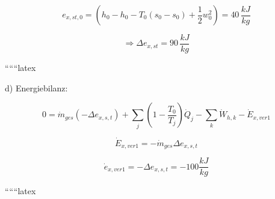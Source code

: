 \[
e_{x,st,0} = \left( h_0 - h_0 - T_0 (s_0 - s_0) + \frac{1}{2} w_0^2 \right) = 40 \, \frac{kJ}{kg}
\]

\[
\Rightarrow \Delta e_{x,st} = 90 \, \frac{kJ}{kg}
\]

``````latex

d) Energiebilanz:

\[
0 = \dot{m}_{ges} \left( -\Delta e_{x,s,t} \right) + \sum_j \left( 1 - \frac{T_0}{T_j} \right) \dot{Q}_j - \sum_k \dot{W}_{h,k} - \dot{E}_{x,ver1}
\]

\[
\dot{E}_{x,ver1} = -\dot{m}_{ges} \Delta e_{x,s,t}
\]

\[
\dot{e}_{x,ver1} = -\Delta e_{x,s,t} = -100 \frac{kJ}{kg}
\]

``````latex


